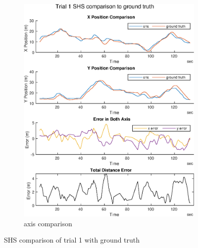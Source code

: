 \begin{figure}[H]
\begin{subfigure}[t]{.45\textwidth}
		\includegraphics[width=\linewidth]{images/20201029_1040_trial1_shs_2}
		\caption{axis comparison}
		\label{fig:trial1_comparison}
	\end{subfigure}
	\caption{SHS comparison of trial 1 with ground truth}
	\label{fig:trial1_shs_gt_comparison}
\end{figure}

